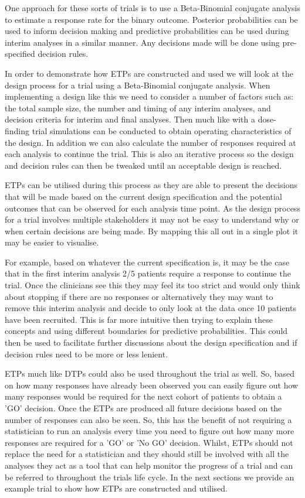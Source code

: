One approach for these sorts of trials is to use a Beta-Binomial conjugate analysis to estimate a response rate for the binary outcome. Posterior probabilities can be used to inform decision making and predictive probabilities can be used during interim analyses in a similar manner. Any decisions made will be done using pre-specified decision rules.

In order to demonstrate how ETPs are constructed and used we will look at the design process for a trial using a Beta-Binomial conjugate analysis. When implementing a design like this we need to consider a number of factors such as: the total sample size, the number and timing of any interim analyses, and decision criteria for interim and final analyses. Then much like with a dose-finding trial simulations can be conducted to obtain operating characteristics of the design. In addition we can also calculate the number of responses required at each analysis to continue the trial. This is also an iterative process so the design and decision rules can then be tweaked until an acceptable design is reached. 

ETPs can be utilised during this process as they are able to present the decisions that will be made based on the current design specification and the potential outcomes that can be observed for each analysis time point. As the design process for a trial involves multiple stakeholders it may not be easy to understand why or when certain decisions are being made. By mapping this all out in a single plot it may be easier to visualise. 

For example, based on whatever the current specification is, it may be the case that in the first interim analysis 2/5 patients require a response to continue the trial. Once the clinicians see this they may feel its too strict and would only think about stopping if there are no responses or alternatively they may want to remove this interim analysis and decide to only look at the data once 10 patients have been recruited. This is far more intuitive then trying to explain these concepts and using different boundaries for predictive probabilities. This could then be used to facilitate further discussions about the design specification and if decision rules need to be more or less lenient.  

ETPs much like DTPs could also be used throughout the trial as well. So, based on how many responses have already been observed you can easily figure out how many responses would be required for the next cohort of patients to obtain a 'GO' decision. Once the ETPs are produced all future decisions based on the number of responses can also be seen. So, this has the benefit of not requiring a statistician to run an analysis every time you need to figure out how many more responses are required for a 'GO' or 'No GO' decision. Whilst, ETPs should not replace the need for a statistician and they should still be involved with all the analyses they act as a tool that can help monitor the progress of a trial and can be referred to throughout the trials life cycle. In the next sections we provide an example trial to show how ETPs are constructed and utilised. 

